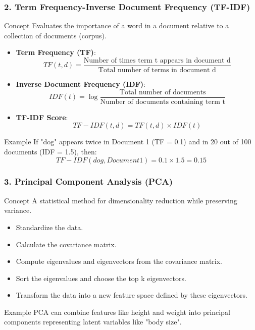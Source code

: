 \documentclass[aspectratio=169]{beamer}
\begin{document}
\begin{frame}[fragile]
    \frametitle{2. Term Frequency-Inverse Document Frequency (TF-IDF)}
    \begin{block}{Concept}
        Evaluates the importance of a word in a document relative to a collection of documents (corpus).
    \end{block}
    
    \begin{itemize}
        \item \textbf{Term Frequency (TF)}: 
        \[
        TF(t, d) = \frac{\text{Number of times term t appears in document d}}{\text{Total number of terms in document d}}
        \]
        
        \item \textbf{Inverse Document Frequency (IDF)}: 
        \[
        IDF(t) = \log{\frac{\text{Total number of documents}}{\text{Number of documents containing term t}}}
        \]
        
        \item \textbf{TF-IDF Score}:
        \[
        TF-IDF(t, d) = TF(t, d) \times IDF(t)
        \]
    \end{itemize}
    
    \begin{exampleblock}{Example}
        If "dog" appears twice in Document 1 (TF = 0.1) and in 20 out of 100 documents (IDF = 1.5), then:
        \[
        TF-IDF(dog, Document 1) = 0.1 \times 1.5 = 0.15
        \]
    \end{exampleblock}
\end{frame}

\begin{frame}[fragile]
    \frametitle{3. Principal Component Analysis (PCA)}
    \begin{block}{Concept}
        A statistical method for dimensionality reduction while preserving variance.
    \end{block}
    
    \begin{itemize}
        \item Standardize the data.
        \item Calculate the covariance matrix.
        \item Compute eigenvalues and eigenvectors from the covariance matrix.
        \item Sort the eigenvalues and choose the top k eigenvectors.
        \item Transform the data into a new feature space defined by these eigenvectors.
    \end{itemize}
        
    \begin{exampleblock}{Example}
        PCA can combine features like height and weight into principal components representing latent variables like "body size".
    \end{exampleblock}
\end{frame}
\end{document}
